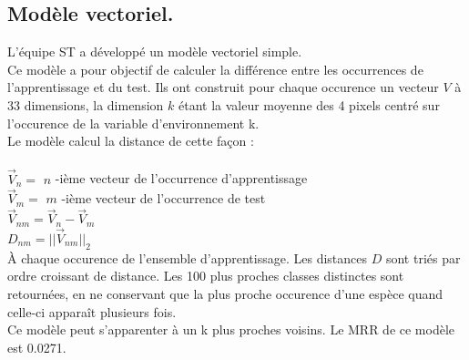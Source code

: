 \documentclass{article}
\begin{document}
\subsection{Modèle vectoriel.}
L'équipe ST a développé un modèle vectoriel simple. \\
Ce modèle a pour objectif de calculer la différence entre les occurrences de l'apprentissage et du test.
Ils ont construit pour chaque occurence un vecteur $V$ à 33 dimensions, la dimension $k$ étant la valeur moyenne des 4 pixels centré sur l’occurence de la variable d’environnement k.\\
Le modèle calcul la distance de cette façon :\\ \\
$\overrightarrow{V}_{n} = $ $n$ -ième vecteur de l'occurrence d'apprentissage \\
$\overrightarrow{V}_{m} = $ $m$ -ième vecteur de l'occurrence de test \\
$\overrightarrow{V}_{nm} = \overrightarrow{V}_{n} - \overrightarrow{V}_{m} $\\
$ D_{nm} = || \overrightarrow{V}_{nm} ||_{2}$\\
À chaque occurence de l’ensemble d’apprentissage. Les distances $D$ sont triés par ordre croissant de distance. Les 100 plus proches classes distinctes sont retournées, en ne conservant que la plus proche occurence d’une espèce quand celle-ci apparaît plusieurs fois.\\
Ce modèle peut s'apparenter à un k plus proches voisins.
Le MRR de ce modèle est 0.0271.
\end{document}
